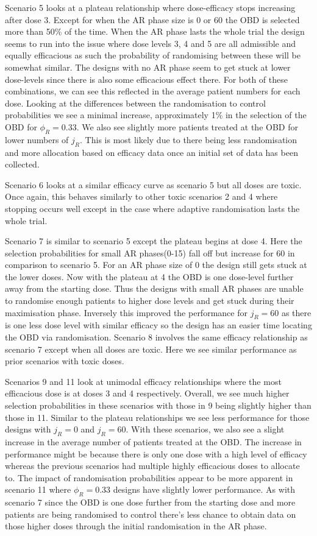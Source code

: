 Scenario 5 looks at a plateau relationship where dose-efficacy stops increasing after dose 3. Except for when the AR phase size is 0 or 60 the OBD is selected more than 50\% of the time. When the AR phase lasts the whole trial the design seems to run into the issue where dose levels 3, 4 and 5 are all admissible and equally efficacious as such the probability of randomising between these will be somewhat similar. The designs with no AR phase seem to get stuck at lower dose-levels since there is also some efficacious effect there. For both of these combinations, we can see this reflected in the average patient numbers for each dose. Looking at the differences between the randomisation to control probabilities we see a minimal increase, approximately 1\% in the selection of the OBD for $\phi_R = 0.33$. We also see slightly more patients treated at the OBD for lower numbers of $j_R$. This is most likely due to there being less randomisation and more allocation based on efficacy data once an initial set of data has been collected. 

Scenario 6 looks at a similar efficacy curve as scenario 5 but all doses are toxic. Once again, this behaves similarly to other toxic scenarios 2 and 4 where stopping occurs well except in the case where adaptive randomisation lasts the whole trial. 

Scenario 7 is similar to scenario 5 except the plateau begins at dose 4. Here the selection probabilities for small AR phases(0-15) fall off but increase for 60 in comparison to scenario 5. For an AR phase size of 0 the design still gets stuck at the lower doses. Now with the plateau at 4 the OBD is one dose-level further away from the starting dose. Thus the designs with small AR phases are unable to randomise enough patients to higher dose levels and get stuck during their maximisation phase. Inversely this improved the performance for $j_R = 60$ as there is one less dose level with similar efficacy so the design has an easier time locating the OBD via randomisation. Scenario 8 involves the same efficacy relationship as scenario 7 except when all doses are toxic. Here we see similar performance as prior scenarios with toxic doses.  

Scenarios 9 and 11 look at unimodal efficacy relationships where the most efficacious dose is at doses 3 and 4 respectively. Overall, we see much higher selection probabilities in these scenarios with those in 9 being slightly higher than those in 11. Similar to the plateau relationships we see less performance for those designs with $j_R = 0$ and  $j_R = 60$. With these scenarios, we also see a slight increase in the average number of patients treated at the OBD. The increase in performance might be because there is only one dose with a high level of efficacy whereas the previous scenarios had multiple highly efficacious doses to allocate to. The impact of randomisation probabilities appear to be more apparent in scenario 11 where $\phi_R = 0.33$ designs have slightly lower performance. As with scenario 7 since the OBD is one dose further from the starting dose and more patients are being randomised to control there's less chance to obtain data on those higher doses through the initial randomisation in the AR phase. 

